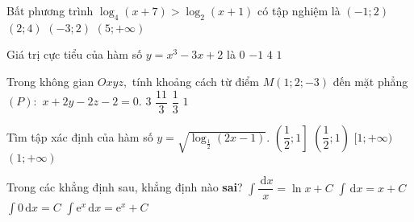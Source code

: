 \begin{ex}%
Bất phương trình $\log_4(x+7) > \log_2(x+1)$ có tập nghiệm là
\choice
{\True $(-1;2)$}
{$(2;4)$}
{$(-3;2)$}
{$(5;+\infty)$} 
\end{ex} 
\begin{ex}%
Giá trị cực tiểu của hàm số $y=x^3-3x+2$ là
\choice
{\True $0$}
{$-1$}
{$4$}
{$1$} 
\end{ex} 
\begin{ex}%
Trong không gian $Oxyz,$ tính khoảng cách từ điểm $M(1;2;-3)$ đến mặt phẳng $(P):$ $x+2y-2z-2=0$.
\choice
{\True $3$}
{$\dfrac{11}{3}$}
{$\dfrac{1}{3}$}
{$1$} 
\end{ex} 
\begin{ex}%
Tìm tập xác định của hàm số $y=\sqrt{\log_{\frac{1}{2}}(2x-1)}$.
\choice
{\True $\left (\dfrac{1}{2};1\right ]$}
{$\left (\dfrac{1}{2};1\right )$}
{$[1;+\infty)$}
{$(1;+\infty)$} 
\loigiai{ Điều kiện $\heva{&2x-1>0\\&\log_{\frac{1}{2}}(2x-1)\ge 0} \Leftrightarrow \heva {&x>\dfrac{1}{2}\\&2x-1 \le 1} \Leftrightarrow \dfrac{1}{2}<x \le 1 $\\
Tập xác định $\left (\dfrac{1}{2};1\right ]$}
\end{ex} 
\begin{ex}%
Trong các khẳng định sau, khẳng định nào \textbf{sai}?
\choice
{\True $\displaystyle \int \dfrac{\mathrm{\, d}x }{x}=\ln x+C$}
{$\displaystyle \int \mathrm{\, d}x =x+C$}
{$\displaystyle \int 0\mathrm{\, d}x =C$}
{$\displaystyle \int \mathrm{e}^x\mathrm{\, d}x =\mathrm{e}^x+C$} 
\end{ex} 
